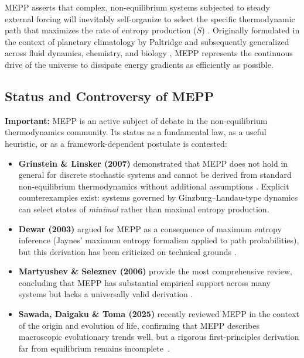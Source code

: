 \documentclass[12pt,a4paper]{article}
\theoremstyle{remark}
\begin{document}
MEPP asserts that complex, non-equilibrium systems subjected to steady external forcing will inevitably self-organize to select the specific thermodynamic path that maximizes the rate of entropy production ($\dot{S}$) \citep{MEPPFoundations}. Originally formulated in the context of planetary climatology by Paltridge \citep{Paltridge1975} and subsequently generalized across fluid dynamics, chemistry, and biology \citep{MEPP2004}, MEPP represents the continuous drive of the universe to dissipate energy gradients as efficiently as possible.

\subsection{Status and Controversy of MEPP}

\textbf{Important:} MEPP is an active subject of debate in the non-equilibrium thermodynamics community. Its status as a fundamental law, as a useful heuristic, or as a framework-dependent postulate is contested:

\begin{itemize}
    \item \textbf{Grinstein \& Linsker (2007)} demonstrated that MEPP does not hold in general for discrete stochastic systems and cannot be derived from standard non-equilibrium thermodynamics without additional assumptions \citep{GrinsteinLinsker2007}. Explicit counterexamples exist: systems governed by Ginzburg--Landau-type dynamics can select states of \emph{minimal} rather than maximal entropy production.
    \item \textbf{Dewar (2003)} argued for MEPP as a consequence of maximum entropy inference (Jaynes' maximum entropy formalism \citep{Jaynes1957} applied to path probabilities), but this derivation has been criticized on technical grounds \citep{Dewar2003}.
    \item \textbf{Martyushev \& Seleznev (2006)} provide the most comprehensive review, concluding that MEPP has substantial empirical support across many systems but lacks a universally valid derivation \citep{MartyushevSeleznev2006}.
    \item \textbf{Sawada, Daigaku \& Toma (2025)} recently reviewed MEPP in the context of the origin and evolution of life, confirming that MEPP describes macroscopic evolutionary trends well, but a rigorous first-principles derivation far from equilibrium remains incomplete~\citep{Sawada2025}.
\end{itemize}
\end{document}
